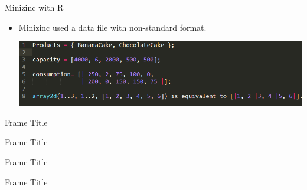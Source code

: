 \documentclass[xcolor=dvipsnames,aspectratio=169]{beamer}
\begin{document}
\begin{frame}{Minizinc with R}
   \begin{itemize}
       \item Minizinc used a data file with non-standard format. 
        
       \includegraphics[scale = 0.65]{minizinc_data.PNG} 
   \end{itemize}
    
\end{frame}



\begin{frame}{Frame Title}
    
\end{frame}

\begin{frame}{Frame Title}
    
\end{frame}

\begin{frame}{Frame Title}
    
\end{frame}

\begin{frame}{Frame Title}
    
\end{frame}
\end{document}
